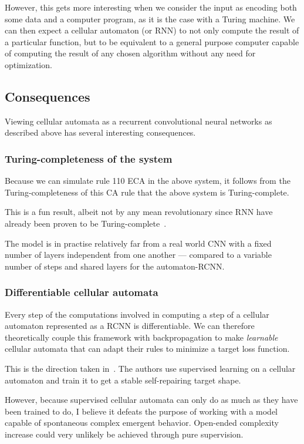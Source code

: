 However, this gets more interesting when we consider the input as encoding both
some data and a computer program, as it is the case with a Turing machine. We can
then expect a cellular automaton (or RNN) to not only compute the result of a particular
function, but to be equivalent to a general purpose computer capable of
computing the result of any chosen algorithm without any need for optimization.


\subsection{Consequences}

Viewing cellular automata as a recurrent convolutional neural networks  as
described above has several interesting consequences.

\subsubsection{Turing-completeness of the system}

Because we can simulate rule 110 ECA in the above system, it follows from the
Turing-completeness of this CA rule that the above system is Turing-complete.

This is a fun result, albeit not by any mean revolutionary since RNN have already
been proven to be Turing-complete~\parencite{siegelmannComputationalPowerNeural1992}.

The model is in practise relatively far from a real world CNN with a fixed
number of layers independent from one another --- compared to a variable number
of steps and shared layers for the automaton-RCNN\@.

\subsubsection{Differentiable cellular automata}

Every step of the computations involved in computing a step of a cellular
automaton represented as a RCNN is differentiable. We can therefore
theoretically couple this framework with backpropagation to make
\emph{learnable} cellular automata that can adapt their rules to minimize a
target loss function.

This is the direction taken in~\cite{mordvintsevGrowingNeuralCellular2020}. The
authors use supervised learning on a cellular automaton and train it to get a
stable self-repairing target shape.

However, because supervised cellular automata can only do as much as they have
been trained to do, I believe it defeats the purpose of working with a model
capable of spontaneous complex emergent behavior. Open-ended complexity increase
could very unlikely be achieved through pure supervision.

